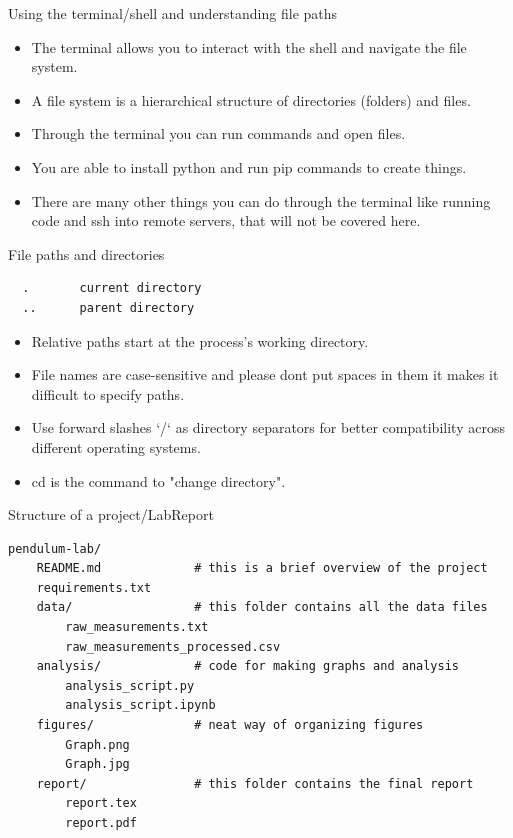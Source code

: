 \documentclass[aspectratio=169,11pt]{beamer}
\begin{document}
\begin{frame}{Using the terminal/shell and understanding file paths}
  \begin{itemize}
    \item The terminal allows you to interact with the shell and navigate the file system.
    \item A file system is a hierarchical structure of directories (folders) and files.
    \item Through the terminal you can run commands and open files.
    \item You are able to install python and run pip commands to create things.
    \item There are many other things you can do through the terminal like running code and ssh into remote servers, that will not be covered here.
  \end{itemize}
\end{frame}






\begin{frame}[fragile]{File paths and directories}
\begin{verbatim}
  .       current directory
  ..      parent directory
\end{verbatim}
  \begin{itemize}
    \item Relative paths start at the process's working directory.
    \item File names are case-sensitive and please dont put spaces in them it makes it difficult to specify paths.
    \item Use forward slashes `/` as directory separators for better compatibility across different operating systems.
    \item cd is the command to "change directory".  
  \end{itemize}
\end{frame}



\begin{frame}[fragile]{Structure of a project/LabReport}
\begin{verbatim}
pendulum-lab/
    README.md             # this is a brief overview of the project
    requirements.txt
    data/                 # this folder contains all the data files
        raw_measurements.txt
        raw_measurements_processed.csv
    analysis/             # code for making graphs and analysis 
        analysis_script.py
        analysis_script.ipynb
    figures/              # neat way of organizing figures
        Graph.png
        Graph.jpg
    report/               # this folder contains the final report
        report.tex
        report.pdf
\end{verbatim}
\end{frame}
\end{document}
